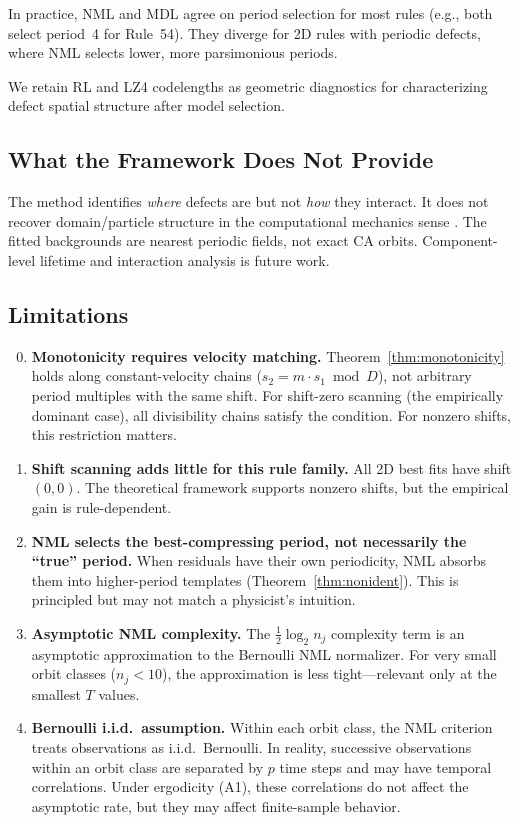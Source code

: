 \documentclass[11pt]{article}
\theoremstyle{definition}
\theoremstyle{remark}
\begin{document}
In practice, NML and MDL agree on period selection for most rules (e.g., both select period~4 for Rule~54).
They diverge for 2D rules with periodic defects, where NML selects lower, more parsimonious periods.

We retain RL and LZ4 codelengths as geometric diagnostics for characterizing defect spatial structure after model selection.

\subsection{What the Framework Does Not Provide}

The method identifies \emph{where} defects are but not \emph{how} they interact.
It does not recover domain/particle structure in the computational mechanics sense \cite{crutchfield1997,hanson1992}.
The fitted backgrounds are nearest periodic fields, not exact CA orbits.
Component-level lifetime and interaction analysis is future work.

\subsection{Limitations}

\begin{enumerate}
    \setcounter{enumi}{-1}
    \item \textbf{Monotonicity requires velocity matching.}
    Theorem~\ref{thm:monotonicity} holds along constant-velocity chains ($s_2 = m \cdot s_1 \bmod D$), not arbitrary period multiples with the same shift.
    For shift-zero scanning (the empirically dominant case), all divisibility chains satisfy the condition.
    For nonzero shifts, this restriction matters.

    \item \textbf{Shift scanning adds little for this rule family.}
    All 2D best fits have shift $(0,0)$.
    The theoretical framework supports nonzero shifts, but the empirical gain is rule-dependent.

    \item \textbf{NML selects the best-compressing period, not necessarily the ``true'' period.}
    When residuals have their own periodicity, NML absorbs them into higher-period templates (Theorem~\ref{thm:nonident}).
    This is principled but may not match a physicist's intuition.

    \item \textbf{Asymptotic NML complexity.}
    The $\frac{1}{2}\log_2 n_j$ complexity term is an asymptotic approximation to the Bernoulli NML normalizer.
    For very small orbit classes ($n_j < 10$), the approximation is less tight---relevant only at the smallest $T$ values.

    \item \textbf{Bernoulli i.i.d.\ assumption.}
    Within each orbit class, the NML criterion treats observations as i.i.d.\ Bernoulli.
    In reality, successive observations within an orbit class are separated by $p$ time steps and may have temporal correlations.
    Under ergodicity (A1), these correlations do not affect the asymptotic rate, but they may affect finite-sample behavior.
\end{enumerate}
\end{document}
